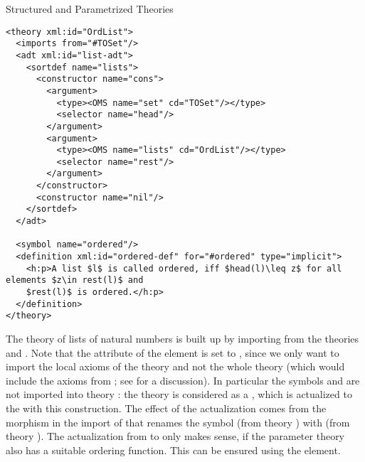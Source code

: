 \begin{omgroup}[id=natlist]{Structured and Parametrized Theories}
\begin{lstlisting}[mathescape,label=ordered-list,
  index={theory,imports,adt,sortdef,constructor,argument,symbol,definition}]
<theory xml:id="OrdList">
  <imports from="#TOSet"/>
  <adt xml:id="list-adt">
    <sortdef name="lists">
      <constructor name="cons">
        <argument>
          <type><OMS name="set" cd="TOSet"/></type>
          <selector name="head"/>
        </argument>
        <argument>
          <type><OMS name="lists" cd="OrdList"/></type>
          <selector name="rest"/>
        </argument>
      </constructor>
      <constructor name="nil"/>
    </sortdef>
  </adt>

  <symbol name="ordered"/>
  <definition xml:id="ordered-def" for="#ordered" type="implicit">
    <h:p>A list $l$ is called ordered, iff $head(l)\leq z$ for all elements $z\in rest(l)$ and
    $rest(l)$ is ordered.</h:p>
  </definition>
</theory>
\end{lstlisting}

The theory {} of lists of natural numbers is built up by importing
from the theories {} and {}. Note that the attribute
{} of the {} element {}
is set to {}, since we only want to import the local axioms
of the theory {} and not the whole theory {} (which
would include the axioms from {}; see {}
for a discussion). In particular the symbols {} and {} are not
imported into theory {}: the theory {} is considered as
a {}, which is actualized to the
{} with this construction.  The effect of the
actualization comes from the morphism {} in the import of
{} that renames the symbol {} (from theory
{}) with {} (from theory {}). The
actualization from {} to {} only makes sense, if the
parameter theory {} also has a suitable ordering function.  This can be
ensured using the {\omdoc} {} element.


\end{omgroup}
